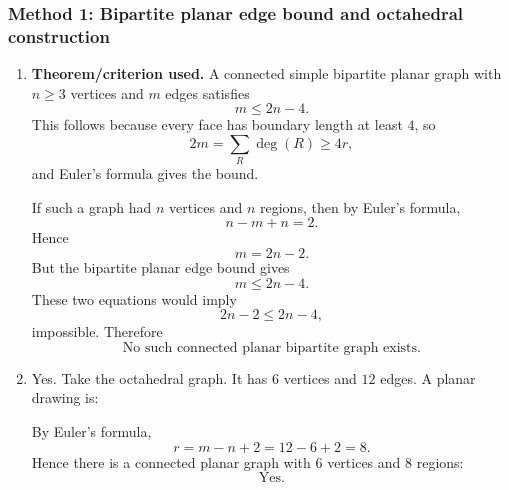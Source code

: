 \documentclass[12pt]{article}
\begin{document}
\subsubsection{Method 1: Bipartite planar edge bound and octahedral construction}
\begin{enumerate}[label=(\alph*)]
  \item \textbf{Theorem/criterion used.} A connected simple bipartite planar graph with $n\ge 3$ vertices and $m$ edges satisfies
  \[
    m\le 2n-4.
  \]
  This follows because every face has boundary length at least $4$, so
  \[
    2m=\sum_R\deg(R)\ge 4r,
  \]
  and Euler's formula gives the bound.

  If such a graph had $n$ vertices and $n$ regions, then by Euler's formula,
  \[
    n-m+n=2.
  \]
  Hence
  \[
    m=2n-2.
  \]
  But the bipartite planar edge bound gives
  \[
    m\le 2n-4.
  \]
  These two equations would imply
  \[
    2n-2\le 2n-4,
  \]
  impossible. Therefore
  \[
    \boxed{\text{No such connected planar bipartite graph exists}.}
  \]

  \item Yes. Take the octahedral graph. It has $6$ vertices and $12$ edges. A planar drawing is:
  \begin{center}
  \end{center}
  By Euler's formula,
  \[
    r=m-n+2=12-6+2=8.
  \]
  Hence there is a connected planar graph with $6$ vertices and $8$ regions:
  \[
    \boxed{\text{Yes}.}
  \]
\end{enumerate}
\end{document}
